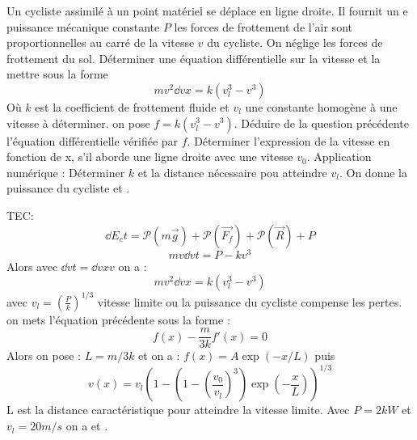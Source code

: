 \begin{Exercise}[title=Cycliste au tour de France]
  Un cycliste assimilé à un point matériel se déplace en ligne droite. Il
  fournit un e puissance mécanique constante $P$ les forces de frottement de
  l'air sont proportionnelles au carré de la vitesse $v$ du cycliste. On néglige
  les forces de frottement du sol.
  	\Question Déterminer une équation différentielle sur la vitesse et la mettre
    sous la forme \[mv^2\dd{v}{x} = k (v_l^3-v^3)\]
    Où $k$ est la coefficient de frottement fluide et $v_l$ une constante
    homogène à une vitesse à déterminer.
    \Question on pose $f = k (v_l^3-v^3)$.
	\subQuestion Déduire de la question précédente l'équation différentielle vérifiée par $f$.
	\subQuestion Déterminer l'expression de la vitesse en fonction de x, s'il
    aborde une ligne droite avec une vitesse $v_0$.
    \subQuestion Application numérique : Déterminer $k$ et la distance
    nécessaire pou atteindre $v_l$. On donne la puissance du cycliste
      et .
\end{Exercise}
\begin{Answer}
	\Question
    TEC: \[\dd{E_c}{t}=\mathcal{P}(m\vec{g})+\mathcal{P}(\vec{F_f})+\mathcal{P}(\vec{R})+P\]
	\[mv\dd{v}{t} = P-kv^3\]
    Alors avec $\dd{v}{t}=\dd{v}{x}v$ on a :
    \[mv^2\dd{v}{x}=k(v_l^3-v^3)\]
	avec $v_l = \left(\frac{P}{k}\right)^{1/3}$ vitesse limite ou la puissance
    du cycliste compense les pertes.
    \Question
	\subQuestion on mets l'équation précédente sous la forme :
	\[f(x)-\frac{m}{3k}f'(x) = 0\]
	\subQuestion Alors on pose : $L=m/3k$ et on a : $f(x)=A\exp(-x/L)$ puis
	\[v(x)=v_l\left(1-\left(1-\left(\frac{v_0}{v_l}\right)^3\right)\exp\left(-\frac{x}{L}\right)\right)^{1/3}\]
	L est la distance caractéristique pour atteindre la vitesse limite.
	\subQuestion Avec $P=2kW$ et $v_l=20m/s$ on a et .
\end{Answer}
